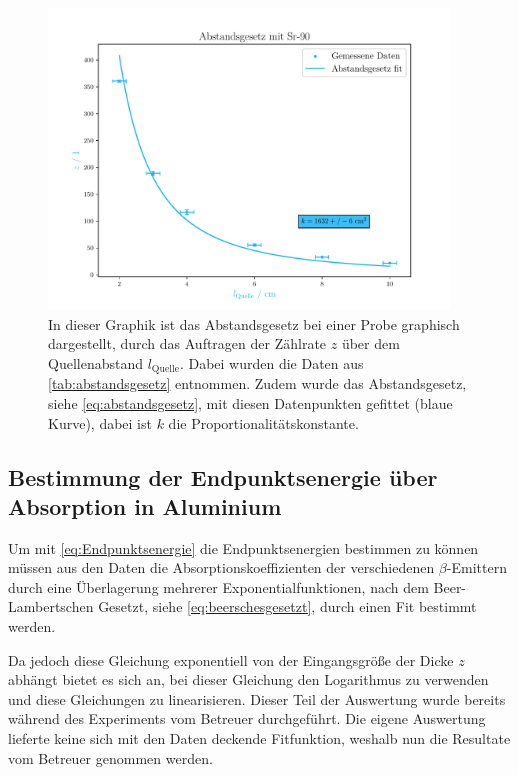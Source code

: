 \documentclass[12pt,english,ngerman]{scrartcl}
\begin{document}
\begin{figure}[H]
	\begin{center}
		\includegraphics[width = 0.95\textwidth]{figures/abstandsgesetz.pdf}
	\end{center}
	\caption[Abstandsgesetz einer  Probe]{In dieser Graphik ist
		das Abstandsgesetz bei einer  Probe graphisch dargestellt,
		durch das Auftragen der Zählrate $z$ über dem Quellenabstand
		$l_{\mathrm{Quelle}}$. Dabei wurden die Daten aus
		\autoref{tab:abstandsgesetz} entnommen. Zudem wurde das Abstandsgesetz, siehe
		\autoref{eq:abstandsgesetz}, mit diesen Datenpunkten gefittet (blaue Kurve),
		dabei ist $k$ die Proportionalitätskonstante.}\label{fig:abstandsgesetz}
\end{figure}

\subsection{Bestimmung der Endpunktsenergie über Absorption in Aluminium}

Um mit \autoref{eq:Endpunktsenergie} die Endpunktsenergien bestimmen zu können
müssen aus den Daten die Absorptionskoeffizienten der verschiedenen
$\beta$-Emittern durch eine Überlagerung mehrerer Exponentialfunktionen, nach
dem Beer-Lambertschen Gesetzt, siehe \autoref{eq:beerschesgesetzt}, durch einen
Fit bestimmt werden.

Da jedoch diese Gleichung exponentiell von der Eingangsgröße der Dicke $z$
abhängt bietet es sich an, bei dieser Gleichung den Logarithmus zu verwenden
und diese Gleichungen zu linearisieren. Dieser Teil der Auswertung wurde
bereits während des Experiments vom Betreuer durchgeführt. Die eigene
Auswertung lieferte keine sich mit den Daten deckende Fitfunktion, weshalb nun
die Resultate vom Betreuer genommen werden.
\end{document}
